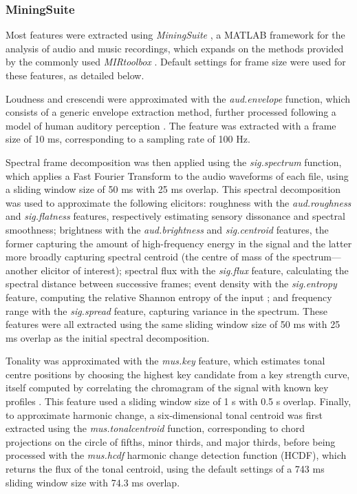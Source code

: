 \subsubsection{MiningSuite}

Most features were extracted using \emph{MiningSuite} \parencite{lartillot2019}, a MATLAB framework for the analysis of audio and music recordings, which expands on the methods provided by the commonly used \emph{MIRtoolbox} \parencite{lartillot2008}. Default settings for frame size were used for these features, as detailed below.

Loudness and crescendi were approximated with the \emph{aud.envelope} function, which consists of a generic envelope extraction method, further processed following a model of human auditory perception \parencite{klapuri2006}. The feature was extracted with a frame size of 10 ms, corresponding to a sampling rate of 100 Hz.

Spectral frame decomposition was then applied using the \emph{sig.spectrum} function, which applies a Fast Fourier Transform to the audio waveforms of each file, using a sliding window size of 50 ms with 25 ms overlap. This spectral decomposition was used to approximate the following elicitors: roughness with the \emph{aud.roughness} and \emph{sig.flatness} features, respectively estimating sensory dissonance and spectral smoothness; brightness with the \emph{aud.brightness} and \emph{sig.centroid} features, the former capturing the amount of high-frequency energy in the signal and the latter more broadly capturing spectral centroid (the centre of mass of the spectrum---another elicitor of interest); spectral flux with the \emph{sig.flux} feature, calculating the spectral distance between successive frames; event density with the \emph{sig.entropy} feature, computing the relative Shannon entropy of the input \parencite{shannon1948}; and frequency range with the \emph{sig.spread} feature, capturing variance in the spectrum. These features were all extracted using the same sliding window size of 50 ms with 25 ms overlap as the initial spectral decomposition.

Tonality was approximated with the \emph{mus.key} feature, which estimates tonal centre positions by choosing the highest key candidate from a key strength curve, itself computed by correlating the chromagram of the signal with known key profiles \parencite{gomez2006,krumhansl1990}. This feature used a sliding window size of 1 s with 0.5 s overlap. Finally, to approximate harmonic change, a six-dimensional tonal centroid was first extracted using the \emph{mus.tonalcentroid} function, corresponding to chord projections on the circle of fifths, minor thirds, and major thirds, before being processed with the \emph{mus.hcdf} harmonic change detection function (HCDF), which returns the flux of the tonal centroid, using the default settings of a 743 ms sliding window size with 74.3 ms overlap.


